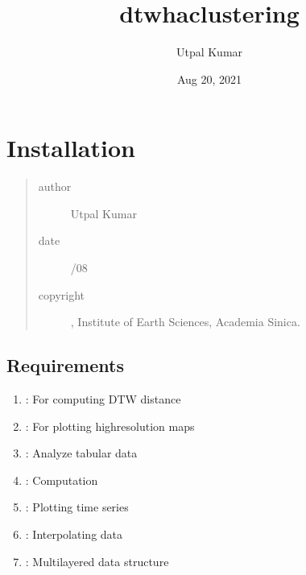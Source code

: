 \documentclass[letterpaper,10pt,english]{sphinxmanual}
\title{dtwhaclustering}
\date{Aug 20, 2021}
\author{Utpal Kumar}
\begin{document}
\pagestyle{empty}
\sphinxmaketitle
\pagestyle{plain}
\sphinxtableofcontents
\pagestyle{normal}
\label{\detokenize{index::doc}}



\chapter{Installation}
\label{\detokenize{usage/install:installation}}\label{\detokenize{usage/install::doc}}\begin{quote}\begin{description}
\item[{author}] \leavevmode
\sphinxAtStartPar
Utpal Kumar

\item[{date}] \leavevmode
{}/08

\item[{copyright}] \leavevmode
{}, Institute of Earth Sciences, Academia Sinica.

\end{description}\end{quote}


\section{Requirements}
\label{\detokenize{usage/install:requirements}}\begin{enumerate}
%
\item {} 
\sphinxAtStartPar
{}: For computing DTW distance

\item {} 
\sphinxAtStartPar
{}: For plotting high\sphinxhyphen{}resolution maps

\item {} 
\sphinxAtStartPar
{}: Analyze tabular data

\item {} 
\sphinxAtStartPar
{}: Computation

\item {} 
\sphinxAtStartPar
{}: Plotting time series

\item {} 
\sphinxAtStartPar
{}: Interpolating data

\item {} 
\sphinxAtStartPar
{}: Multilayered data structure

\end{enumerate}
\end{document}
